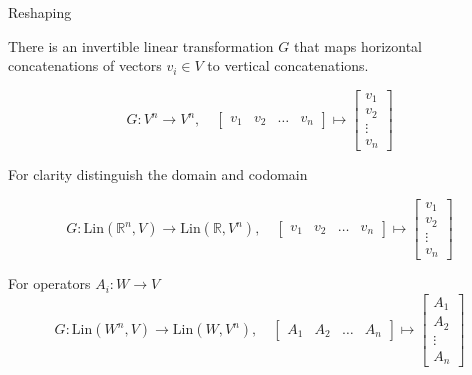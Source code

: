 \documentclass[9pt]{beamer}
\newcommand\Lin{\mathrm{Lin}}   %
\begin{document}
\begin{frame}[fragile]{Reshaping}

There is an invertible linear transformation $G$ that maps horizontal concatenations of vectors $v_i \in V$ to vertical concatenations.


$$G: V^n \rightarrow V^n, \quad  \begin{bmatrix} v_1 & v_2 & \ldots & v_n \end{bmatrix} \mapsto  \begin{bmatrix} v_1 \\ v_2 \\ \vdots \\ v_n \end{bmatrix} $$

For clarity distinguish the domain and codomain

$$G: \Lin(\mathbb{R}^n,V) \rightarrow \Lin(\mathbb{R},V^n), \quad \begin{bmatrix}v_1 & v_2 & \ldots & v_n \end{bmatrix} \mapsto  \begin{bmatrix} v_1 \\ v_2 \\ \vdots \\ v_n \end{bmatrix} $$
\pause

For operators $A_i:  W \rightarrow V$
$$G: \Lin(W^n,V) \rightarrow \Lin(W,V^n), \quad \begin{bmatrix} A_1 & A_2 & \ldots & A_n \end{bmatrix} \mapsto  \begin{bmatrix} A_1 \\ A_2 \\ \vdots \\ A_n \end{bmatrix} $$


\end{frame}

\end{document}
